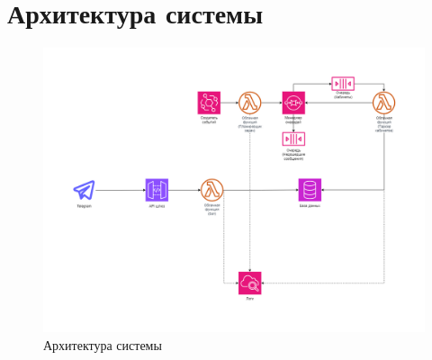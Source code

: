 \chapter{Архитектура системы}

\begin{figure}[h]
    \centering
    \includegraphics[scale=0.4]{img/functional}
    \caption{Архитектура системы}
    \label{fig:cp}
\end{figure}

